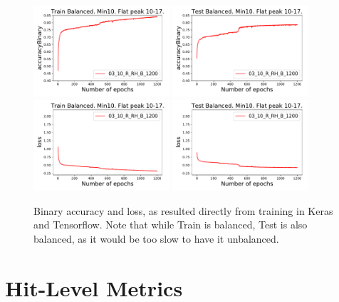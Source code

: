 \begin{figure}[t]
\centering
\includegraphics[width=0.45\textwidth]{plots/plot_01_1_overlay_graph_accuracyBinary_Train.pdf}
\includegraphics[width=0.45\textwidth]{plots/plot_01_1_overlay_graph_accuracyBinary_Test.pdf}\\
\includegraphics[width=0.45\textwidth]{plots/plot_01_1_overlay_graph_loss_Train.pdf}
\includegraphics[width=0.45\textwidth]{plots/plot_01_1_overlay_graph_loss_Test.pdf}\\
\caption{Binary accuracy and loss, as resulted directly from training in Keras and Tensorflow. Note that while Train is balanced, Test is also balanced, as it would be too slow to have it unbalanced.}
\label{fig:AccuracyLoss}
\end{figure}

\section{Hit-Level Metrics}
\label{sec:HitLevelMetrics}

